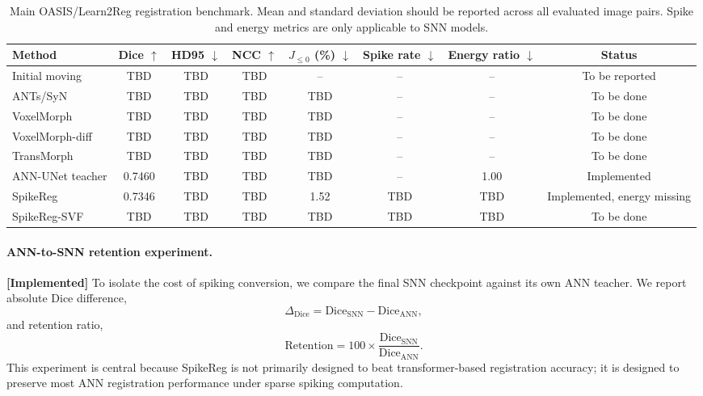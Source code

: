 \begin{table}[t]
\centering
\caption{Main OASIS/Learn2Reg registration benchmark. Mean and standard deviation should be reported across all evaluated image pairs. Spike and energy metrics are only applicable to SNN models.}
\label{tab:main_benchmark}
\begin{tabular}{lccccccc}
\toprule
Method & Dice $\uparrow$ & HD95 $\downarrow$ & NCC $\uparrow$ & $J_{\leq0}$ (\%) $\downarrow$ & Spike rate $\downarrow$ & Energy ratio $\downarrow$ & Status \\
\midrule
Initial moving & TBD & TBD & TBD & -- & -- & -- & To be reported \\
ANTs/SyN & TBD & TBD & TBD & TBD & -- & -- & To be done \\
VoxelMorph & TBD & TBD & TBD & TBD & -- & -- & To be done \\
VoxelMorph-diff & TBD & TBD & TBD & TBD & -- & -- & To be done \\
TransMorph & TBD & TBD & TBD & TBD & -- & -- & To be done \\
ANN-UNet teacher & 0.7460 & TBD & TBD & TBD & -- & 1.00 & Implemented \\
SpikeReg & 0.7346 & TBD & TBD & 1.52 & TBD & TBD & Implemented, energy missing \\
SpikeReg-SVF & TBD & TBD & TBD & TBD & TBD & TBD & To be done \\
\bottomrule
\end{tabular}
\end{table}

\paragraph{ANN-to-SNN retention experiment.}
\textbf{[Implemented]} To isolate the cost of spiking conversion, we compare the final SNN checkpoint against its own ANN teacher. We report absolute Dice difference,
\begin{equation}
\Delta_{\mathrm{Dice}}
=
\mathrm{Dice}_{\mathrm{SNN}}
-
\mathrm{Dice}_{\mathrm{ANN}},
\end{equation}
and retention ratio,
\begin{equation}
\mathrm{Retention}
=
100 \times
\frac{\mathrm{Dice}_{\mathrm{SNN}}}
{\mathrm{Dice}_{\mathrm{ANN}}}.
\end{equation}
This experiment is central because SpikeReg is not primarily designed to beat transformer-based registration accuracy; it is designed to preserve most ANN registration performance under sparse spiking computation.

